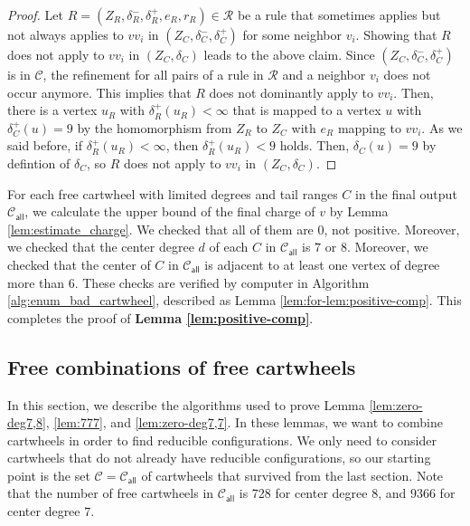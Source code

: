 \documentclass[10pt,a4paper]{article}
\def\cC{{\mathcal C}}
\def\showlabel#1{}
\begin{document}
\begin{proof}
    Let $R=(Z_R, \delta_R^-, \delta_R^+, e_R, r_R) \in \mathcal{R}$ be a rule that sometimes applies but not always applies to $vv_i$ in $(Z_C, \delta_C^-, \delta_C^+)$ for some neighbor $v_i$.
    Showing that $R$ does not apply to $vv_i$ in $(Z_C, \delta_C)$ leads to the above claim.
    Since $(Z_C, \delta_C^-, \delta_C^+)$ is in $\mathcal{C}$, the refinement for all pairs of a rule in $\mathcal{R}$ and a neighbor $v_i$ does not occur anymore.
    This implies that $R$ does not dominantly apply to $vv_i$.
    Then, there is a vertex $u_R$ with $\delta_R^+(u_R) < \infty$ that is mapped to a vertex $u$ with $\delta_C^+(u)=9$ by the homomorphism from $Z_R$ to $Z_C$ with $e_R$ mapping to $vv_i$.
    As we said before, if $\delta_R^+(u_R) < \infty$, then $\delta_R^+(u_R) < 9$ holds.
    Then, $\delta_C(u)=9$ by defintion of $\delta_C$, so $R$ does not apply to $vv_i$ in $(Z_C, \delta_C)$.
\end{proof}

For each free cartwheel with limited degrees and tail ranges $C$ in the final output $\mathcal{C}_{\textsf{all}}$, we calculate the upper bound of the final charge of $v$ by Lemma \ref{lem:estimate_charge}.
We checked that all of them are 0, not positive.
Moreover, we checked that the center degree $d$ of each $C$ in $\mathcal{C}_{\textsf{all}}$ is $7$ or $8$.
Moreover, we checked that the center of $C$ in $\mathcal{C}_{\textsf{all}}$ is adjacent to at least one vertex of degree more than 6.
These checks are verified by computer in Algorithm \ref{alg:enum_bad_cartwheel}, described as Lemma \ref{lem:for-lem:positive-comp}.
This completes the proof of \textbf{Lemma \ref{lem:positive-comp}}.

\subsection{Free combinations of free cartwheels}
\label{subsect:combine-cartwheel}
\showlabel{subsect:combine-cartwheel}
In this section, we describe the algorithms used to prove Lemma \ref{lem:zero-deg7,8}, \ref{lem:777}, and \ref{lem:zero-deg7,7}.
In these lemmas, we want to combine cartwheels in order to find reducible configurations. We only need to consider cartwheels that do not already have reducible configurations, so our starting point is the set $\cC=\mathcal{C}_{\textsf{all}}$ of cartwheels that survived from the last section.
Note that the number of free cartwheels in $\mathcal{C}_{\textsf{all}}$ is 728 for center degree 8, and $9366$ for center degree $7$.
\end{document}
